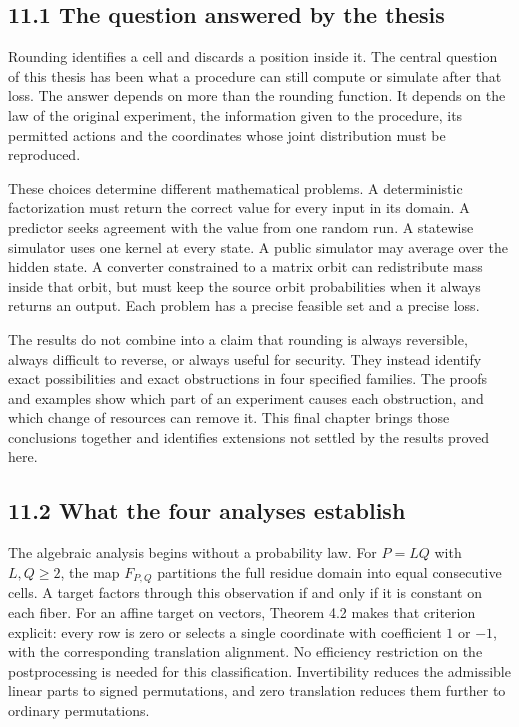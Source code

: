 \documentclass[
]{article}
\begin{document}
\subsection{11.1 The question answered by the
thesis}\label{the-question-answered-by-the-thesis}

Rounding identifies a cell and discards a position inside it. The
central question of this thesis has been what a procedure can still
compute or simulate after that loss. The answer depends on more than the
rounding function. It depends on the law of the original experiment, the
information given to the procedure, its permitted actions and the
coordinates whose joint distribution must be reproduced.

These choices determine different mathematical problems. A deterministic
factorization must return the correct value for every input in its
domain. A predictor seeks agreement with the value from one random run.
A statewise simulator uses one kernel at every state. A public simulator
may average over the hidden state. A converter constrained to a matrix
orbit can redistribute mass inside that orbit, but must keep the source
orbit probabilities when it always returns an output. Each problem has a
precise feasible set and a precise loss.

The results do not combine into a claim that rounding is always
reversible, always difficult to reverse, or always useful for security.
They instead identify exact possibilities and exact obstructions in four
specified families. The proofs and examples show which part of an
experiment causes each obstruction, and which change of resources can
remove it. This final chapter brings those conclusions together and
identifies extensions not settled by the results proved here.

\subsection{11.2 What the four analyses
establish}\label{what-the-four-analyses-establish}

The algebraic analysis begins without a probability law. For \(P=LQ\)
with \(L,Q\ge2\), the map \(F_{P,Q}\) partitions the full residue domain
into equal consecutive cells. A target factors through this observation
if and only if it is constant on each fiber. For an affine target on
vectors, Theorem 4.2 makes that criterion explicit: every row is zero or
selects a single coordinate with coefficient \(1\) or \(-1\), with the
corresponding translation alignment. No efficiency restriction on the
postprocessing is needed for this classification. Invertibility reduces
the admissible linear parts to signed permutations, and zero translation
reduces them further to ordinary permutations.
\end{document}
